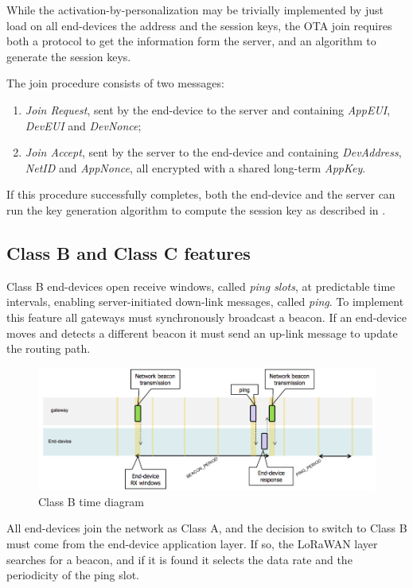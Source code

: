 While the activation-by-personalization may be trivially implemented by just load on all end-devices the address and the session keys, the OTA join requires both a protocol to get the information form the server, and an algorithm to generate the session keys.

The join procedure consists of two messages:
\begin{enumerate}
\item \emph{Join Request}, sent by the end-device to the server and containing \emph{AppEUI}, \emph{DevEUI} and \emph{DevNonce};
\item \emph{Join Accept}, sent by the server to the end-device and containing \emph{DevAddress}, \emph{NetID} and \emph{AppNonce}, all encrypted with a shared long-term \emph{AppKey}.
\end{enumerate}
If this procedure successfully completes, both the end-device and the server can run the key generation algorithm to compute the session key as described in \cite{lorawanspec}.


\subsection{Class B and Class C features}
Class B end-devices open receive windows, called \emph{ping slots}, at predictable time intervals, enabling server-initiated down-link messages, called \emph{ping}. To implement this feature all gateways must synchronously broadcast a beacon. If an end-device moves and detects a different beacon it must send an up-link message to update the routing path.

\begin{figure}[]
\centering
\includegraphics[width=\textwidth]{img/class_b}
\caption{Class B time diagram}
\label{fig:classb}
\end{figure}

All end-devices join the network as Class A, and the decision to switch to Class B must come from the end-device application layer. If so, the LoRaWAN layer searches for a beacon, and if it is found it selects the data rate and the periodicity of the ping slot.

